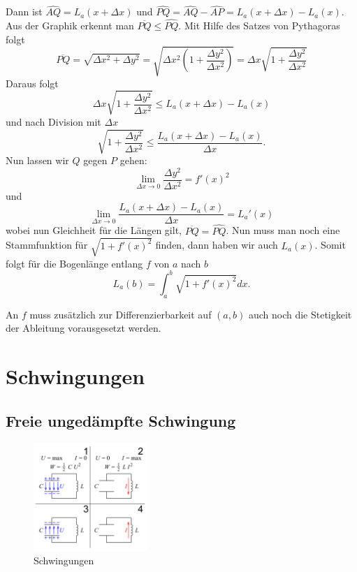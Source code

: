 \documentclass[%
11pt,%
twoside,%
titlepage,%
german,%
headsepline%
]{scrartcl}
\begin{document}
Dann ist $\hat{AQ}=L_a(x+\Delta x)$ und $\hat{PQ}=\hat{AQ}-\hat{AP}=L_a(x+\Delta x)-L_a(x)$. Aus der Graphik erkennt man $\overline{PQ}\leq\hat{PQ}$. Mit Hilfe des Satzes von Pythagoras folgt
$$
\overline{PQ} =\sqrt{\Delta x^2+\Delta y^2}=\sqrt{\Delta x^2\left(1+\frac{\Delta y^2}{\Delta x^2}\right)}=\Delta x\sqrt{1+\frac{\Delta y^2}{\Delta x^2}}
$$
Daraus folgt
$$\Delta x\sqrt{1+\frac{\Delta y^2}{\Delta x^2}}\leq L_a(x+\Delta x)-L_a(x)$$
und nach Division mit $\Delta x$
$$\sqrt{1+\frac{\Delta y^2}{\Delta x^2}}\leq\frac{L_a(x+\Delta x)-L_a(x)}{\Delta x}.$$
Nun lassen wir $Q$ gegen $P$ gehen:
$$\lim_{\Delta x\to0}\frac{\Delta y^2}{\Delta x^2}=f'(x)^2$$
und
$$\lim_{\Delta x\to0}\frac{L_a(x+\Delta x)-L_a(x)}{\Delta x}=L_a'(x)$$
wobei nun Gleichheit f\"ur die L\"angen gilt,  $\overline{PQ}=\hat{PQ}$.
Nun muss man noch eine Stammfunktion f\"ur $\sqrt{1+f'(x)^2}$ finden, dann haben wir auch $L_a(x)$. Somit folgt f\"ur die Bogenl\"ange entlang $f$ von $a$ nach $b$
$$L_a(b)=\int_a^b\sqrt{1+f'(x)^2}dx.$$
\begin{bem}
An $f$ muss zus\"atzlich zur Differenzierbarkeit auf $(a,b)$ auch noch die Stetigkeit der Ableitung vorausgesetzt werden.
\end{bem}

\section{Schwingungen}
\subsection{Freie unged\"ampfte Schwingung}

\begin{figure}
\vspace{20pt}
  \begin{center}
    \includegraphics[width=0.382\textwidth]{pictures/schwing}
  \end{center}
\caption{Schwingungen}
\vspace{-50pt}
\end{figure}
\end{document}
